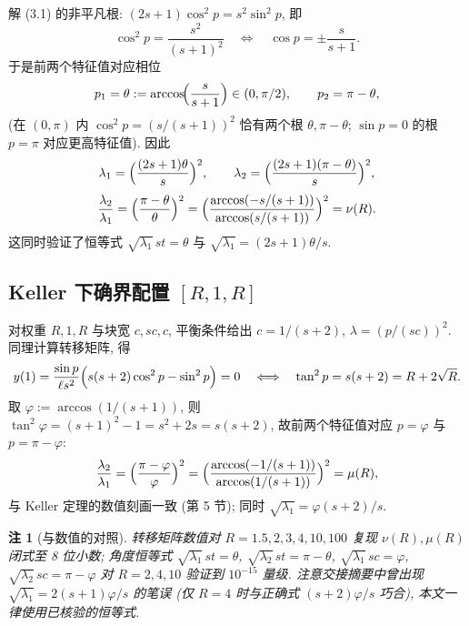 \documentclass[UTF8]{ctexart}
\newtheorem{remark}[theorem]{注}
\begin{document}
解 (3.1) 的非平凡根: $(2s+1)\cos^2 p = s^2 \sin^2 p$, 即
\begin{equation}
	\cos^2 p = \frac{s^2}{(s+1)^2}
	\quad\Longleftrightarrow\quad
	\cos p = \pm \frac{s}{s+1} .
\end{equation}
于是前两个特征值对应相位
\begin{equation}
	p_1 = \theta := \arccos\!\Bigl( \frac{s}{s+1} \Bigr) \in (0, \pi/2),
	\qquad
	p_2 = \pi - \theta ,
\end{equation}
(在 $(0, \pi)$ 内 $\cos^2 p = (s/(s+1))^2$ 恰有两个根 $\theta, \pi-\theta$;
$\sin p = 0$ 的根 $p = \pi$ 对应更高特征值). 因此
\begin{equation}
	\lambda_1 = \Bigl( \frac{(2s+1)\theta}{s} \Bigr)^2,
	\qquad
	\lambda_2 = \Bigl( \frac{(2s+1)(\pi-\theta)}{s} \Bigr)^2,
\end{equation}
\begin{equation}
	\frac{\lambda_2}{\lambda_1} = \Bigl( \frac{\pi - \theta}{\theta} \Bigr)^2
	= \Bigl( \frac{\arccos(-s/(s+1))}{\arccos(s/(s+1))} \Bigr)^2 = \nu(R).
\end{equation}
这同时验证了恒等式 $\sqrt{\lambda_1}\,st = \theta$ 与 $\sqrt{\lambda_1} = (2s+1)\theta/s$.

\subsection{Keller 下确界配置 \texorpdfstring{$[R,1,R]$}{[R,1,R]}}

对权重 $R, 1, R$ 与块宽 $c, sc, c$, 平衡条件给出 $c = 1/(s+2)$,
$\lambda = (p/(sc))^2$. 同理计算转移矩阵, 得
\begin{equation}
	y(1) = \frac{\sin p}{\ell s^2}\Bigl( s(s+2)\cos^2 p - \sin^2 p \Bigr) = 0
	\quad\Longleftrightarrow\quad
	\tan^2 p = s(s+2) = R + 2\sqrt{R} .
\end{equation}
取 $\varphi := \arccos(1/(s+1))$, 则 $\tan^2\varphi = (s+1)^2 - 1 = s^2 + 2s = s(s+2)$,
故前两个特征值对应 $p = \varphi$ 与 $p = \pi - \varphi$:
\begin{equation}
	\frac{\lambda_2}{\lambda_1} = \Bigl( \frac{\pi - \varphi}{\varphi} \Bigr)^2
	= \Bigl( \frac{\arccos(-1/(s+1))}{\arccos(1/(s+1))} \Bigr)^2 = \mu(R),
\end{equation}
与 Keller 定理的数值刻画一致 (第 5 节); 同时 $\sqrt{\lambda_1} = \varphi(s+2)/s$.

\begin{remark}[与数值的对照]
转移矩阵数值对 $R = 1.5, 2, 3, 4, 10, 100$ 复现 $\nu(R), \mu(R)$ 闭式至 8 位小数;
角度恒等式 $\sqrt{\lambda_1}\,st = \theta$, $\sqrt{\lambda_2}\,st = \pi-\theta$,
$\sqrt{\lambda_1}\,sc = \varphi$, $\sqrt{\lambda_2}\,sc = \pi-\varphi$ 对 $R = 2, 4, 10$
验证到 $10^{-15}$ 量级. 注意交接摘要中曾出现 $\sqrt{\lambda_1} = 2(s+1)\varphi/s$ 的笔误
(仅 $R = 4$ 时与正确式 $(s+2)\varphi/s$ 巧合), 本文一律使用已核验的恒等式.
\end{remark}
\end{document}
